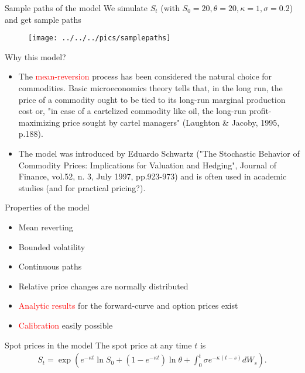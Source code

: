 {%
{Sample paths of the model}
We simulate $S_t$ (with $S_0=20, \theta = 20, \kappa = 1, \sigma = 0.2$) and get sample paths
\begin{figure}
	\centering
		\texttt{[image: ../../../pics/samplepaths]}
	\label{fig:samplepahts}
\end{figure}





{Why this model?}
\begin{itemize}
\item<1-> The \textcolor{red}{mean-reversion} process has been considered the natural choice for commodities. Basic microeconomics theory tells that, in the long run, the price of a commodity ought to be tied to its long-run marginal production cost or, "in case of a cartelized commodity like oil, the long-run profit-maximizing price sought by cartel managers" (Laughton \& Jacoby, 1995, p.188).
\item<2->  The model was introduced by Eduardo Schwartz ("The Stochastic Behavior of Commodity Prices: Implications for Valuation and Hedging", Journal of Finance, vol.52, n. 3, July 1997, pp.923-973) and is often used in academic studies (and for practical pricing?).
\end{itemize}



{Properties of the model}
\begin{itemize}
\item<1-> Mean reverting
\item<2-> Bounded volatility
\item<3-> Continuous paths
\item<4-> Relative price changes are normally distributed
\item<5-> \textcolor{red}{Analytic results} for the forward-curve and option prices exist
\item<6-> \textcolor{red}{Calibration} easily possible
\end{itemize}




{Spot prices in the model}
The spot price at any time $t$ is
\begin{align*}
	S_t = \exp \left( e^{-\kappa t} \ln S_0 + (1-e^{-\kappa t}) \ln \theta + \int_0^t{\sigma e^{-\kappa (t-s)}}dW_s \right).
\end{align*}



}
